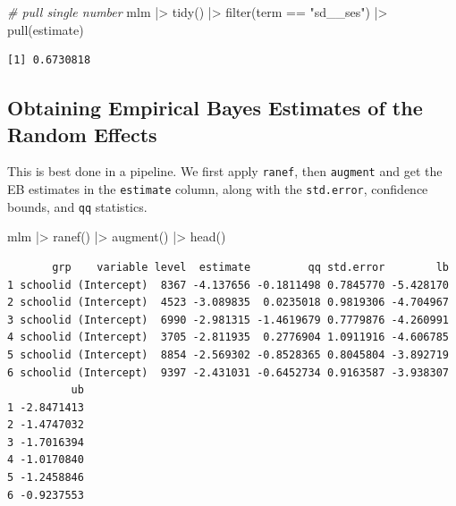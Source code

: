 \documentclass[
  letterpaper,
  DIV=11,
  numbers=noendperiod]{scrreprt}
\newenvironment{Shaded}{}{}
\newcommand{\CommentTok}[1]{\textcolor[rgb]{0.38,0.63,0.69}{\textit{#1}}}
\newcommand{\FunctionTok}[1]{\textcolor[rgb]{0.02,0.16,0.49}{#1}}
\newcommand{\NormalTok}[1]{#1}
\newcommand{\SpecialCharTok}[1]{\textcolor[rgb]{0.25,0.44,0.63}{#1}}
\newcommand{\StringTok}[1]{\textcolor[rgb]{0.25,0.44,0.63}{#1}}
\begin{document}
\begin{Shaded}
\begin{Highlighting}[]
\CommentTok{\# pull single number}
\NormalTok{mlm }\SpecialCharTok{|\textgreater{}} 
  \FunctionTok{tidy}\NormalTok{() }\SpecialCharTok{|\textgreater{}} 
  \FunctionTok{filter}\NormalTok{(term }\SpecialCharTok{==} \StringTok{"sd\_\_ses"}\NormalTok{) }\SpecialCharTok{|\textgreater{}} 
  \FunctionTok{pull}\NormalTok{(estimate)}
\end{Highlighting}
\end{Shaded}

\begin{verbatim}
[1] 0.6730818
\end{verbatim}

\subsection{Obtaining Empirical Bayes Estimates of the Random
Effects}\label{obtaining-empirical-bayes-estimates-of-the-random-effects}

This is best done in a pipeline. We first apply \texttt{ranef}, then
\texttt{augment} and get the EB estimates in the \texttt{estimate}
column, along with the \texttt{std.error}, confidence bounds, and
\texttt{qq} statistics.

\begin{Shaded}
\begin{Highlighting}[]
\NormalTok{mlm }\SpecialCharTok{|\textgreater{}} 
  \FunctionTok{ranef}\NormalTok{() }\SpecialCharTok{|\textgreater{}} 
  \FunctionTok{augment}\NormalTok{() }\SpecialCharTok{|\textgreater{}} 
  \FunctionTok{head}\NormalTok{()}
\end{Highlighting}
\end{Shaded}

\begin{verbatim}
       grp    variable level  estimate         qq std.error        lb
1 schoolid (Intercept)  8367 -4.137656 -0.1811498 0.7845770 -5.428170
2 schoolid (Intercept)  4523 -3.089835  0.0235018 0.9819306 -4.704967
3 schoolid (Intercept)  6990 -2.981315 -1.4619679 0.7779876 -4.260991
4 schoolid (Intercept)  3705 -2.811935  0.2776904 1.0911916 -4.606785
5 schoolid (Intercept)  8854 -2.569302 -0.8528365 0.8045804 -3.892719
6 schoolid (Intercept)  9397 -2.431031 -0.6452734 0.9163587 -3.938307
          ub
1 -2.8471413
2 -1.4747032
3 -1.7016394
4 -1.0170840
5 -1.2458846
6 -0.9237553
\end{verbatim}
\end{document}

